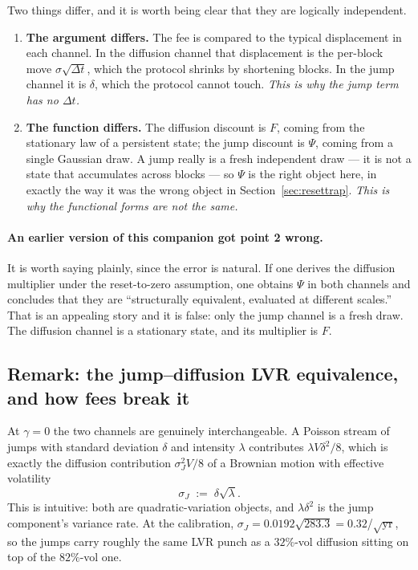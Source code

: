 \documentclass[11pt]{article}
\theoremstyle{definition}
\theoremstyle{remark}
\newcommand{\dt}{\Delta t}
\newcommand{\1}{\mathbf{1}}
\begin{document}
Two things differ, and it is worth being clear that they are logically independent.

\begin{enumerate}[leftmargin=2em]
\item \textbf{The argument differs.} The fee is compared to the typical displacement in each channel. In the diffusion channel that displacement is the per-block move $\sigma\sqrt{\dt}$, which the protocol shrinks by shortening blocks. In the jump channel it is $\delta$, which the protocol cannot touch. \emph{This is why the jump term has no $\dt$.}
\item \textbf{The function differs.} The diffusion discount is $F$, coming from the stationary law of a persistent state; the jump discount is $\Psi$, coming from a single Gaussian draw. A jump really is a fresh independent draw --- it is not a state that accumulates across blocks --- so $\Psi$ is the right object here, in exactly the way it was the wrong object in Section~\ref{sec:resettrap}. \emph{This is why the functional forms are not the same.}
\end{enumerate}

\paragraph{An earlier version of this companion got point 2 wrong.} It is worth saying plainly, since the error is natural. If one derives the diffusion multiplier under the reset-to-zero assumption, one obtains $\Psi$ in both channels and concludes that they are ``structurally equivalent, evaluated at different scales.'' That is an appealing story and it is false: only the jump channel is a fresh draw. The diffusion channel is a stationary state, and its multiplier is $F$.

\subsection{Remark: the jump--diffusion LVR equivalence, and how fees break it}

At $\gamma = 0$ the two channels are genuinely interchangeable. A Poisson stream of jumps with standard deviation $\delta$ and intensity $\lambda$ contributes $\lambda V\delta^2/8$, which is exactly the diffusion contribution $\sigma_J^2V/8$ of a Brownian motion with effective volatility
\[
\sigma_J \;:=\; \delta\sqrt{\lambda} .
\]
This is intuitive: both are quadratic-variation objects, and $\lambda\delta^2$ is the jump component's variance rate. At the calibration, $\sigma_J = 0.0192\sqrt{283.3} = 0.32$/$\sqrt{\text{yr}}$, so the jumps carry roughly the same LVR punch as a $32\%$-vol diffusion sitting on top of the $82\%$-vol one.
\end{document}
